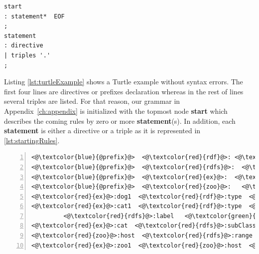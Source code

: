 \begin{lstlisting}[label=lst:startingRules, caption={Starting rules in the grammar file}] 
start
: statement*  EOF
;
statement
: directive
| triples '.'
;
\end{lstlisting}

Listing \ref{lst:turtleExample} shows a Turtle example without syntax errors. 
The first four lines are directives or prefixes declaration whereas in the rest of lines several triples are listed.  
For that reason, our grammar in Appendix~\ref{ch:appendix} is initialized with the topmost node \textbf{start} which describes the coming rules by zero or more  \textbf{statement}(s). 
In addition, each \textbf{statement} is either a directive or a triple as it is represented in \ref{lst:startingRules}.

\begin{lstlisting}[label=lst:turtleExample, numbers=left, caption={RDF example in Turtle serialization format}]
<@\textcolor{blue}{@prefix}@>  <@\textcolor{red}{rdf}@>: <@\textcolor{orange}{<http://www.w3.org/1999/02/22-rdf-syntax-ns\#>}@> .
<@\textcolor{blue}{@prefix}@>  <@\textcolor{red}{rdfs}@>:  <@\textcolor{orange}{<http://www.w3.org/2000/01/rdf-schema\#>}@> .
<@\textcolor{blue}{@prefix}@>  <@\textcolor{red}{ex}@>:  <@\textcolor{orange}{<http://example.org/>}@> .
<@\textcolor{blue}{@prefix}@>  <@\textcolor{red}{zoo}@>:   <@\textcolor{orange}{<http://example.org/zoo/> }@> .
<@\textcolor{red}{ex}@>:dog1  <@\textcolor{red}{rdf}@>:type  <@\textcolor{red}{ex}@>:animal .
<@\textcolor{red}{ex}@>:cat1  <@\textcolor{red}{rdf}@>:type  <@\textcolor{red}{ex}@>:cat ;
         <@\textcolor{red}{rdfs}@>:label   <@\textcolor{green}{"Lusi"@en}@> .
<@\textcolor{red}{ex}@>:cat  <@\textcolor{red}{rdfs}@>:subClassOf  <@\textcolor{red}{ex}@>:animal .
<@\textcolor{red}{zoo}@>:host  <@\textcolor{red}{rdfs}@>:range  <@\textcolor{red}{ex}@>:animal .
<@\textcolor{red}{ex}@>:zoo1  <@\textcolor{red}{zoo}@>:host  <@\textcolor{red}{ex}@>:cat2 .
\end{lstlisting}



